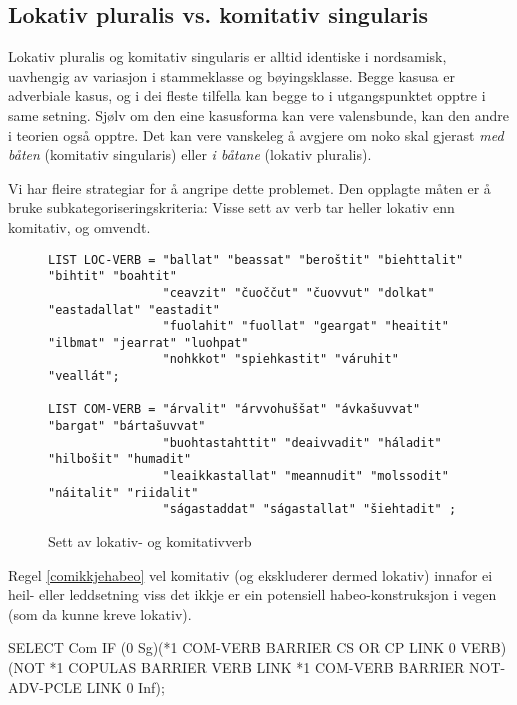 \documentclass[a4paper,nynorsk]{article}
\begin{document}
\subsection{Lokativ pluralis vs. komitativ singularis}


Lokativ pluralis og komitativ singularis er alltid identiske i nordsamisk, uavhengig av variasjon i stammeklasse og bøyingsklasse. Begge kasusa er adverbiale kasus, og i dei fleste tilfella kan begge to i utgangspunktet opptre i same setning. Sjølv om den eine kasusforma kan vere valensbunde, kan den andre i teorien også opptre. Det kan vere vanskeleg å avgjere om noko skal gjerast \textit{med båten} (komitativ singularis) eller \textit{i båtane} (lokativ pluralis). %

Vi har fleire strategiar for å angripe dette problemet. Den opplagte måten er å bruke subkategoriseringskriteria: Visse sett av verb tar heller lokativ enn komitativ, og omvendt. %

\begin{figure}[htbp]
\begin{center}
\begin{verbatim}
LIST LOC-VERB = "ballat" "beassat" "beroštit" "biehttalit" "bihtit" "boahtit" 
                "ceavzit" "čuoččut" "čuovvut" "dolkat" "eastadallat" "eastadit" 
                "fuolahit" "fuollat" "geargat" "heaitit" "ilbmat" "jearrat" "luohpat"
                "nohkkot" "spiehkastit" "váruhit" "veallát";

LIST COM-VERB = "árvalit" "árvvohuššat" "ávkašuvvat" "bargat" "bártašuvvat"
                "buohtastahttit" "deaivvadit" "háladit" "hilbošit" "humadit" 
                "leaikkastallat" "meannudit" "molssodit" "náitalit" "riidalit" 
                "ságastaddat" "ságastallat" "šiehtadit" ;
\end{verbatim}
\caption{Sett av lokativ- og komitativverb}
\label{loccomverb}
\end{center}
\end{figure}

Regel \ref{comikkjehabeo} vel komitativ (og ekskluderer dermed lokativ) innafor ei heil- eller leddsetning viss det ikkje er ein potensiell habeo-konstruksjon i vegen (som da kunne kreve lokativ). %

\begin{example}\label{comikkjehabeo}
SELECT Com IF (0 Sg)(*1 COM-VERB BARRIER CS OR CP LINK 0 VERB)
	(NOT *1 COPULAS BARRIER VERB LINK *1 COM-VERB BARRIER NOT-ADV-PCLE 
	LINK 0 Inf);    
\end{example}
\end{document}
